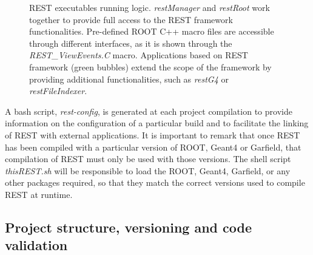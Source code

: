 \begin{figure}[h]
  \centering
	\caption{REST executables running logic. \emph{restManager} and \emph{restRoot} work together to provide full access to the REST framework functionalities. Pre-defined ROOT C++ macro files are accessible through different interfaces, as it is shown through the \emph{REST\_ViewEvents.C} macro. Applications based on REST framework (green bubbles) extend the scope of the framework by providing additional functionalities, such as \emph{restG4} or \emph{restFileIndexer}.}
	\label{fig:executables}
\end{figure}

A bash script, \emph{rest-config}, is generated at each project compilation to provide information on the configuration of a particular build and to facilitate the linking of REST with external applications. It is important to remark that once REST has been compiled with a particular version of ROOT, Geant4 or Garfield, that compilation of REST must only be used with those versions. The shell script \emph{thisREST.sh} will be responsible to load the ROOT, Geant4, Garfield, or any other packages required, so that they match the correct versions used to compile REST at runtime.

\subsection{Project structure, versioning and code validation}

